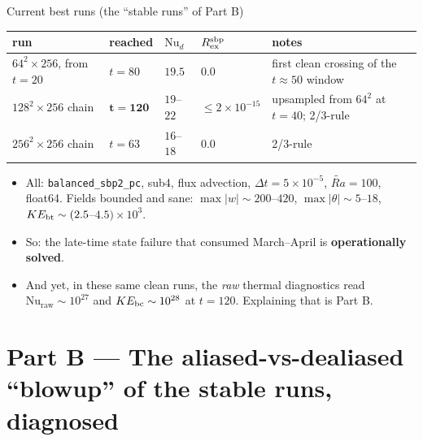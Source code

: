\documentclass[aspectratio=169,10pt]{beamer}
\newcommand{\Rat}{\widetilde{Ra}}
\newcommand{\Nud}{\mathrm{Nu}_{d}}
\newcommand{\Nuraw}{\mathrm{Nu}_{\mathrm{raw}}}
\begin{document}
\begin{frame}{Current best runs (the ``stable runs'' of Part B)}
  \begin{center}
  \small
  \begin{tabular}{@{}lllll@{}}
    \toprule
    run & reached & $\Nud$ & $R_{\rm ex}^{\rm sbp}$ & notes \\
    \midrule
    $64^2\times256$, from $t{=}20$ & $t=80$ & $19.5$ & $0.0$ & first clean crossing of the $t\approx50$ window \\
    $128^2\times256$ chain & $\mathbf{t=120}$ & $19$--$22$ & $\le 2{\times}10^{-15}$ & upsampled from $64^2$ at $t{=}40$; 2/3-rule \\
    $256^2\times256$ chain & $t=63$ & $16$--$18$ & $0.0$ & 2/3-rule \\
    \bottomrule
  \end{tabular}
  \end{center}
  \begin{itemize}
    \item All: \texttt{balanced\_sbp2\_pc}, sub4, flux advection, $\Delta t = 5\times10^{-5}$,
      $\Rat=100$, float64. Fields bounded and sane: $\max|w| \sim 200$--$420$,
      $\max|\theta| \sim 5$--$18$, $KE_{\rm bt}\sim(2.5$--$4.5){\times}10^3$.
    \item So: the late-time state failure that consumed March--April is
      \textbf{operationally solved}.
    \item And yet, in these same clean runs, the \emph{raw} thermal diagnostics
      read $\Nuraw \sim 10^{27}$ and $KE_{\rm bc}\sim10^{28}$ at $t=120$.
      Explaining that is Part B.
  \end{itemize}
\end{frame}

\section[Part B: aliased vs dealiased, diagnosed]{Part B --- The aliased-vs-dealiased ``blowup'' of the stable runs, diagnosed}
\end{document}
